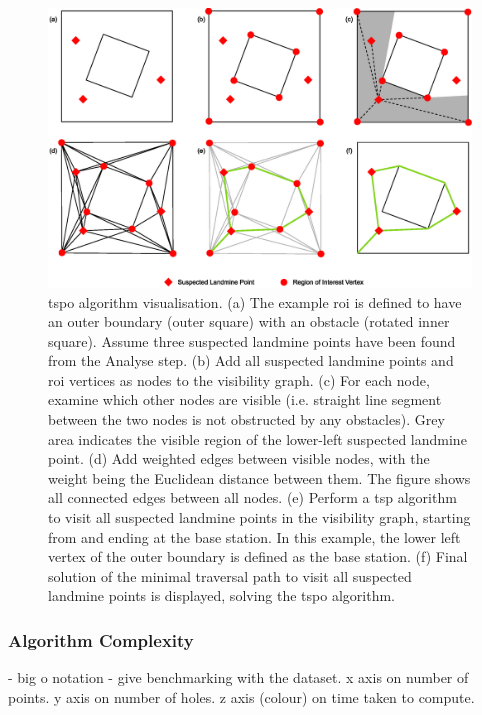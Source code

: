 \begin{figure}[h]
    \centering
    \includegraphics[width=\linewidth]{figs/Jihwan/TSPO Algorithm Visualisation.eps}
    \caption[\gls{tspo} Algorithm Visualisation]
    {\gls{tspo} algorithm visualisation. (a) The example \gls{roi} is defined to have an outer boundary (outer square) with an obstacle (rotated inner square). Assume three suspected landmine points have been found from the Analyse step. (b) Add all suspected landmine points and \gls{roi} vertices as nodes to the visibility graph. (c) For each node, examine which other nodes are visible (i.e. straight line segment between the two nodes is not obstructed by any obstacles). Grey area indicates the visible region of the lower-left suspected landmine point. (d) Add weighted edges between visible nodes, with the weight being the Euclidean distance between them. The figure shows all connected edges between all nodes. (e) Perform a \gls{tsp} algorithm to visit all suspected landmine points in the visibility graph, starting from and ending at the base station. In this example, the lower left vertex of the outer boundary is defined as the base station. (f) Final solution of the minimal traversal path to visit all suspected landmine points is displayed, solving the \gls{tspo} algorithm. 
    }
    \label{fig:msp_tspo}
\end{figure}

\subsubsection{Algorithm Complexity}

- big o notation
- give benchmarking with the dataset. x axis on number of points. y axis on number of holes. z axis (colour) on time taken to compute. 

